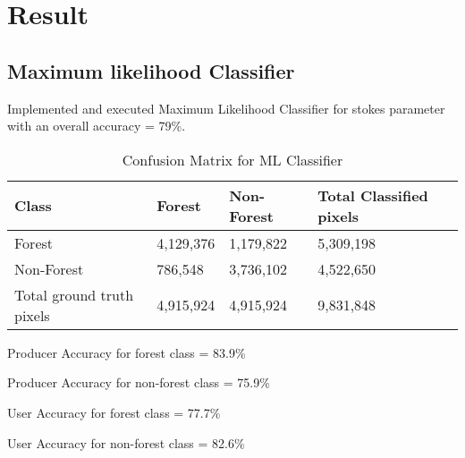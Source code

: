 
\chapter{Result} %

\label{Chapter4} %



\section{Maximum likelihood Classifier}

Implemented and executed Maximum Likelihood Classifier for stokes parameter with an overall accuracy = 79\%. 

\begin{table}[!htbp]
\centering
\caption{Confusion Matrix for ML Classifier}
\label{tab1}
\begin{tabular}{llll}

\hline
Class  & Forest & Non-Forest & Total Classified pixels      \\\hline
Forest         & 4,129,376 & 1,179,822 & 5,309,198 \\\hline
Non-Forest            & 786,548 & 3,736,102 & 4,522,650 \\\hline
Total ground truth pixels   & 4,915,924 & 4,915,924 & 9,831,848
\end{tabular}
\end{table}

Producer Accuracy for forest class = 83.9\%

Producer Accuracy for non-forest class = 75.9\%

User Accuracy for forest class = 77.7\%

User Accuracy for non-forest class = 82.6\%


